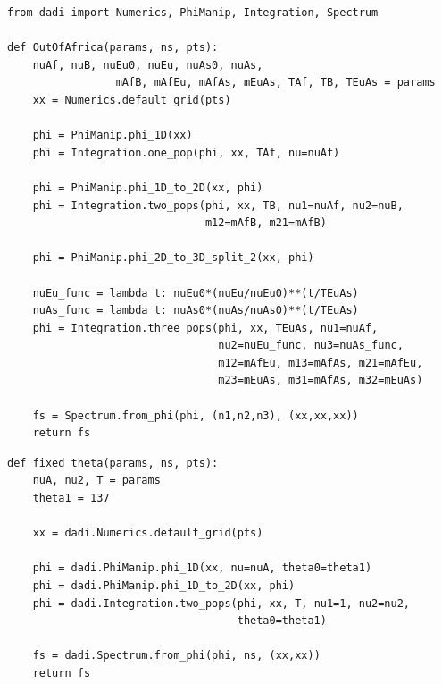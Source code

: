\documentclass[12pt]{article}
\makeatletter
\newcommand{\py}[1]{\lstinline[language=Python, showstringspaces=False]@#1@}
\makeatother
\begin{document}
\begin{lstlisting}[caption={\textbf{Out-of-Africa model from Gutenkunst (2009):} This model involves a size change in the ancestral population, a split, another split, and then exponential growth of populations 1 and 2. (The \py{from dadi import} line imports those modules from the \py{dadi} namespace into the local namespace, so we don't have to type \py{dadi.} to access them.)}, float]
from dadi import Numerics, PhiManip, Integration, Spectrum

def OutOfAfrica(params, ns, pts):
    nuAf, nuB, nuEu0, nuEu, nuAs0, nuAs,
                 mAfB, mAfEu, mAfAs, mEuAs, TAf, TB, TEuAs = params
    xx = Numerics.default_grid(pts)

    phi = PhiManip.phi_1D(xx)
    phi = Integration.one_pop(phi, xx, TAf, nu=nuAf)

    phi = PhiManip.phi_1D_to_2D(xx, phi)
    phi = Integration.two_pops(phi, xx, TB, nu1=nuAf, nu2=nuB,
                               m12=mAfB, m21=mAfB)

    phi = PhiManip.phi_2D_to_3D_split_2(xx, phi)

    nuEu_func = lambda t: nuEu0*(nuEu/nuEu0)**(t/TEuAs)
    nuAs_func = lambda t: nuAs0*(nuAs/nuAs0)**(t/TEuAs)
    phi = Integration.three_pops(phi, xx, TEuAs, nu1=nuAf,
                                 nu2=nuEu_func, nu3=nuAs_func,
                                 m12=mAfEu, m13=mAfAs, m21=mAfEu,
                                 m23=mEuAs, m31=mAfAs, m32=mEuAs)

    fs = Spectrum.from_phi(phi, (n1,n2,n3), (xx,xx,xx))
    return fs
\end{lstlisting}

\begin{lstlisting}[caption={\textbf{Fixed $\boldsymbol{\theta}$:} A split demographic model function with a fixed value of $\theta$=137 for derived population 1. The free parameters are the sizes of the ancestral pop, \py{nuA}, and derived pop 2, \py{nu2}, (relative to derived pop 1), along with the divergence time \py{T} between the two derived pops.}, label={lst:fixed_theta}, float]
def fixed_theta(params, ns, pts):
    nuA, nu2, T = params
    theta1 = 137

    xx = dadi.Numerics.default_grid(pts)

    phi = dadi.PhiManip.phi_1D(xx, nu=nuA, theta0=theta1)
    phi = dadi.PhiManip.phi_1D_to_2D(xx, phi)
    phi = dadi.Integration.two_pops(phi, xx, T, nu1=1, nu2=nu2,
                                    theta0=theta1)

    fs = dadi.Spectrum.from_phi(phi, ns, (xx,xx))
    return fs
\end{lstlisting}
\end{document}
